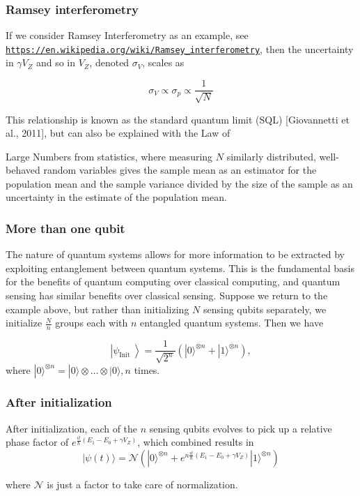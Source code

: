 \documentclass{beamer}
\begin{document}
\begin{frame}
\frametitle{Ramsey interferometry}

If we consider Ramsey Interferometry as an example, see \href{{https://en.wikipedia.org/wiki/Ramsey_interferometry}}{\nolinkurl{https://en.wikipedia.org/wiki/Ramsey_interferometry}}, then the
uncertainty in $\gamma V_Z$ and so in $V_Z$, denoted $\sigma_{V}$,
scales as

\[
\sigma_{V} \propto \sigma_{p} \propto \frac{1}{\sqrt{N}}
\]

This relationship is known as the standard quantum limit (SQL)
[Giovannetti et al., 2011], but can also be explained with the Law of

Large Numbers from statistics, where measuring $N$ similarly
distributed, well-behaved random variables gives the sample mean as an
estimator for the population mean and the sample variance divided by
the size of the sample as an uncertainty in the estimate of the
population mean.
\end{frame}

\begin{frame}
\frametitle{More than one qubit}

The nature of quantum systems allows for more information to be
extracted by exploiting entanglement between quantum systems. This is
the fundamental basis for the benefits of quantum computing over
classical computing, and quantum sensing has similar benefits over
classical sensing. Suppose we return to the example above, but rather
than initializing $N$ sensing qubits separately, we initialize
$\frac{N}{n}$ groups each with $n$ entangled quantum systems. Then we
have

\[
\left|\psi_{\text {Init }}\right\rangle=\frac{1}{\sqrt{2^{n}}}\left(|0\rangle^{\otimes n}+|1\rangle^{\otimes n}\right),
\]
where $|0\rangle^{\otimes n}=|0\rangle \otimes \ldots \otimes|0\rangle, n$ times.
\end{frame}

\begin{frame}
\frametitle{After initialization}

After initialization, each of the $n$ sensing qubits evolves to pick up a relative phase factor of $e^{\frac{i t}{\hbar}\left(E_{1}-E_{0}+\gamma V_Z\right)}$, which combined results in
\[
|\psi(t)\rangle=\mathcal{N}\left(|0\rangle^{\otimes n}+e^{n \frac{i t}{\hbar}\left(E_{1}-E_{0}+\gamma V_Z\right)}|1\rangle^{\otimes n}\right)
\]

where $\mathcal{N}$ is just a factor to take care of normalization.
\end{frame}
\end{document}
